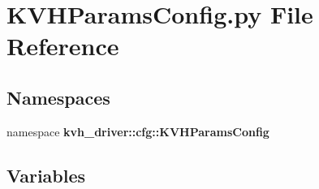\section{\-K\-V\-H\-Params\-Config.\-py \-File \-Reference}
\label{KVHParamsConfig_8py}
\subsection*{\-Namespaces}
\begin{DoxyCompactItemize}
\item 
namespace {\bf kvh\-\_\-driver\-::cfg\-::\-K\-V\-H\-Params\-Config}
\end{DoxyCompactItemize}
\subsection*{\-Variables}
